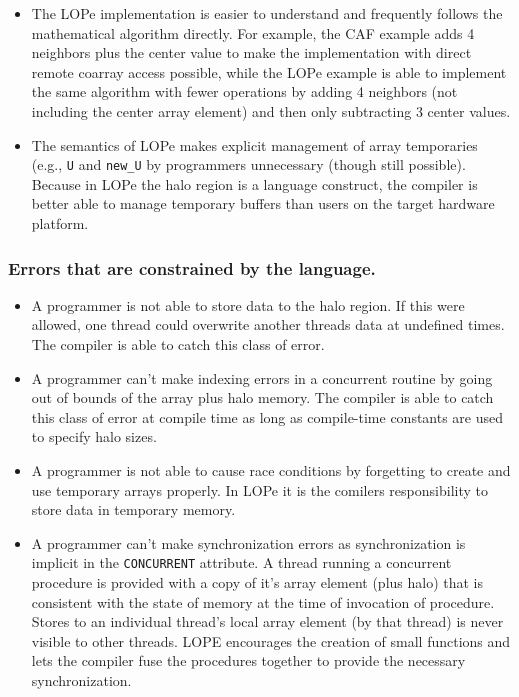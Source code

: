 \begin{itemize}
\item
The LOPe implementation is easier to understand and frequently follows the mathematical
algorithm directly.  For example, the CAF example adds 4 neighbors plus the center value
to make the implementation with direct remote coarray access possible, while the LOPe
example is able to implement the same algorithm with fewer operations by adding 4
neighbors (not including the center array element) and then only subtracting 3 center
values.

\item
The semantics of LOPe makes explicit management of array temporaries (e.g., \texttt{U} and
\texttt{new\_U} by programmers unnecessary (though still possible).  Because in LOPe the
halo region is a language construct, the compiler is better able to manage temporary
buffers than users on the target hardware platform.

\end{itemize}

\subsubsection{Errors that are constrained by the language.}
\begin{itemize}

\item
A programmer is not able to store data to the halo region.  If this were allowed, one
thread could overwrite another threads data at undefined times.  The compiler is able to
catch this class of error.

\item
A programmer can't make indexing errors in a concurrent routine by going out of bounds of
the array plus halo memory.  The compiler is able to catch this class of error at compile
time as long as compile-time constants are used to specify halo sizes.

\item
A programmer is not able to cause race conditions by forgetting to create and
use temporary arrays properly.  In LOPe it is the comilers responsibility to
store data in temporary memory.

\item
A programmer can't make synchronization errors as synchronization is implicit in
the \texttt{CONCURRENT} attribute.  A thread running a concurrent procedure is provided
with a copy of it's array element (plus halo) that is consistent with the state
of memory at the time of invocation of procedure.  Stores to an individual
thread's local array element (by that thread) is never visible to other threads.
LOPE encourages the creation of small functions and lets the compiler
fuse the procedures together to provide the necessary synchronization.

\end{itemize}
